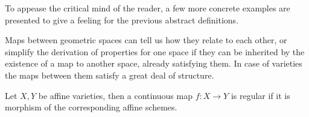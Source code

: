 
To appease the critical mind of the reader, a few more concrete examples are presented to give a feeling for the previous abstract definitions. 


Maps between geometric spaces can tell us how they relate to each other, or simplify 
the derivation of properties for one space if they can be inherited by the existence of a map to another space,
already satisfying them. In case of varieties the maps between them satisfy a great deal of structure.
\begin{definition}
    Let \( X, Y \) be affine varieties, then a continuous map \( f : X \to Y \) is regular
    if it is morphism of the corresponding affine schemes.
\end{definition}

